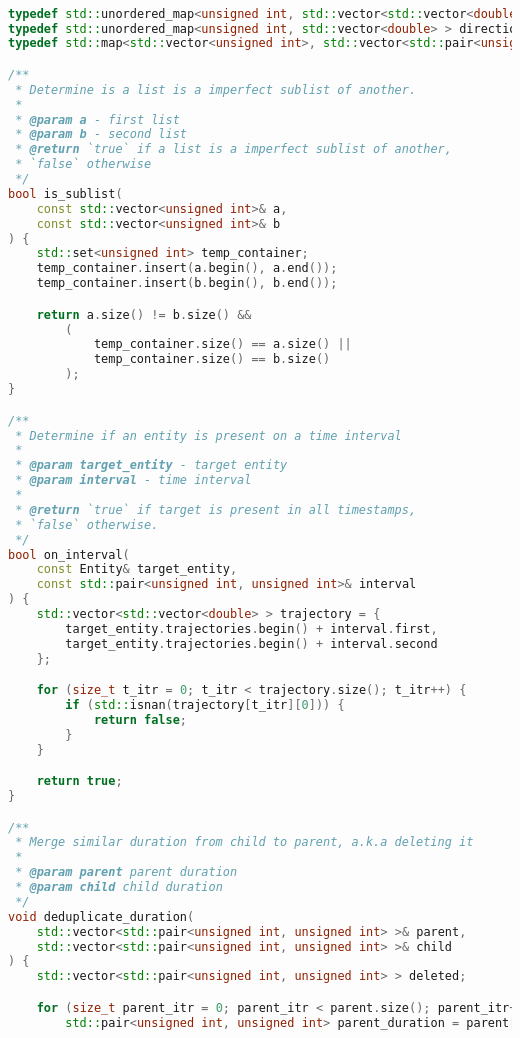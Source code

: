 \begin{lstlisting}[language=C++, caption=Implementasi fungsi \texttt{identify\_rombongan}, label={lamp:identify-rombongan}]

typedef std::unordered_map<unsigned int, std::vector<std::vector<double> > > trajectory_map;
typedef std::unordered_map<unsigned int, std::vector<double> > direction_map;
typedef std::map<std::vector<unsigned int>, std::vector<std::pair<unsigned int, unsigned int> > > rombongan_lifespan;

/**
 * Determine is a list is a imperfect sublist of another.
 *
 * @param a - first list
 * @param b - second list
 * @return `true` if a list is a imperfect sublist of another,
 * `false` otherwise
 */
bool is_sublist(
    const std::vector<unsigned int>& a,
    const std::vector<unsigned int>& b
) {
    std::set<unsigned int> temp_container;
    temp_container.insert(a.begin(), a.end());
    temp_container.insert(b.begin(), b.end());

    return a.size() != b.size() &&
        (
            temp_container.size() == a.size() ||
            temp_container.size() == b.size()
        );
}

/**
 * Determine if an entity is present on a time interval
 * 
 * @param target_entity - target entity
 * @param interval - time interval
 * 
 * @return `true` if target is present in all timestamps,
 * `false` otherwise.
 */
bool on_interval(
    const Entity& target_entity,
    const std::pair<unsigned int, unsigned int>& interval
) {
    std::vector<std::vector<double> > trajectory = {
        target_entity.trajectories.begin() + interval.first,
        target_entity.trajectories.begin() + interval.second
    };

    for (size_t t_itr = 0; t_itr < trajectory.size(); t_itr++) {
        if (std::isnan(trajectory[t_itr][0])) {
            return false;
        }
    }

    return true;
}

/**
 * Merge similar duration from child to parent, a.k.a deleting it
 * 
 * @param parent parent duration
 * @param child child duration
 */
void deduplicate_duration(
    std::vector<std::pair<unsigned int, unsigned int> >& parent,
    std::vector<std::pair<unsigned int, unsigned int> >& child
) {
    std::vector<std::pair<unsigned int, unsigned int> > deleted;

    for (size_t parent_itr = 0; parent_itr < parent.size(); parent_itr++) {
        std::pair<unsigned int, unsigned int> parent_duration = parent[parent_itr];


\end{lstlisting}
